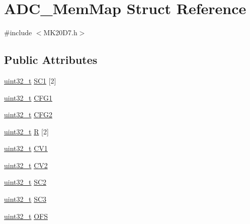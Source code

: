 \hypertarget{struct_a_d_c___mem_map}{}\section{A\+D\+C\+\_\+\+Mem\+Map Struct Reference}
\label{struct_a_d_c___mem_map}


{\ttfamily \#include $<$M\+K20\+D7.\+h$>$}

\subsection*{Public Attributes}
\begin{DoxyCompactItemize}
\item 
\hyperlink{_p_e___types_8h_a33594304e786b158f3fb30289278f5af}{uint32\+\_\+t} \hyperlink{struct_a_d_c___mem_map_a9d2909674291dea7de54b9e641c2a51c}{S\+C1} \mbox{[}2\mbox{]}
\item 
\hyperlink{_p_e___types_8h_a33594304e786b158f3fb30289278f5af}{uint32\+\_\+t} \hyperlink{struct_a_d_c___mem_map_a2320de82d9559e930bc71650b02993b7}{C\+F\+G1}
\item 
\hyperlink{_p_e___types_8h_a33594304e786b158f3fb30289278f5af}{uint32\+\_\+t} \hyperlink{struct_a_d_c___mem_map_aa39dedc8da290763fa121dc4c99dc5a4}{C\+F\+G2}
\item 
\hyperlink{_p_e___types_8h_a33594304e786b158f3fb30289278f5af}{uint32\+\_\+t} \hyperlink{struct_a_d_c___mem_map_adc5637a6af56fc44650bf216491659fc}{R} \mbox{[}2\mbox{]}
\item 
\hyperlink{_p_e___types_8h_a33594304e786b158f3fb30289278f5af}{uint32\+\_\+t} \hyperlink{struct_a_d_c___mem_map_af687bec25a698b31731350c05cd5ba05}{C\+V1}
\item 
\hyperlink{_p_e___types_8h_a33594304e786b158f3fb30289278f5af}{uint32\+\_\+t} \hyperlink{struct_a_d_c___mem_map_acf6745fccc765451358e179f7131e645}{C\+V2}
\item 
\hyperlink{_p_e___types_8h_a33594304e786b158f3fb30289278f5af}{uint32\+\_\+t} \hyperlink{struct_a_d_c___mem_map_ad7caff2bf5e2dfb2159d174af24dc693}{S\+C2}
\item 
\hyperlink{_p_e___types_8h_a33594304e786b158f3fb30289278f5af}{uint32\+\_\+t} \hyperlink{struct_a_d_c___mem_map_a68295218c104f78bc2b11f04c06ce55e}{S\+C3}
\item 
\hyperlink{_p_e___types_8h_a33594304e786b158f3fb30289278f5af}{uint32\+\_\+t} \hyperlink{struct_a_d_c___mem_map_a89e51c569b4a0e4298bc4524afabb594}{O\+FS}
\item 

\end{DoxyCompactItemize}
